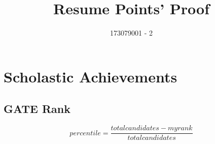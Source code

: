\documentclass{article}
\title{Resume Points' Proof}
\author{173079001 - 2}
\date{}
\begin{document}
\maketitle
\tableofcontents
\newpage
\section{Scholastic Achievements}
	\subsection{GATE Rank}
		$$percentile = \frac{total candidates - myrank }{total candidates}$$
		\begin{figure}[h]
		\end{figure}

\newpage
\end{document}
